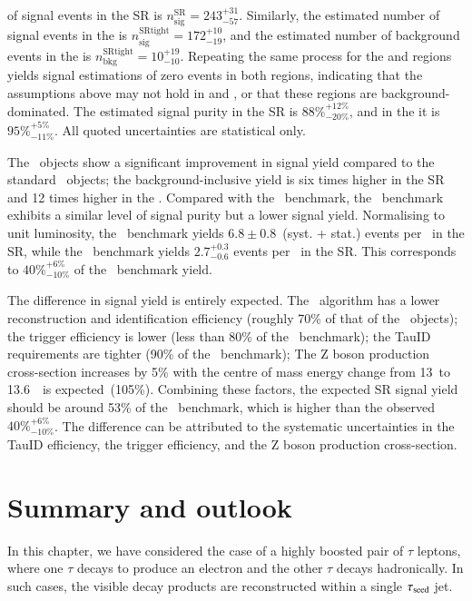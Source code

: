         of signal events in the SR is \( n^\mathrm{SR}_\mathrm{sig} = 243^{+31}_{-57} \). 
        Similarly, the estimated number of signal events in the \SRtight is 
        \( n^\mathrm{SRtight}_\mathrm{sig} = 172^{+10}_{-19} \), and the estimated number 
        of background events in the \SRtight is \( n^\mathrm{SRtight}_\mathrm{bkg} = 10^{+19}_{-10} \).
        Repeating the same process for the \SRstd and \SRtightstd regions yields signal 
        estimations of zero events in both regions, indicating that the assumptions above 
        may not hold in \SRstd and \SRtightstd, or that these regions are background-dominated.
        The estimated signal purity in the SR is \( 88\%^{+12\%}_{-20\%} \), 
        and in the \SRtight it is \( 95\%^{+5\%}_{-11\%} \). All quoted uncertainties are statistical only.
        
        The \tauhaderm\ objects show a significant improvement in signal yield compared to the standard 
        \tauhad\ objects; the background-inclusive yield is six times higher in the SR and 12 times 
        higher in the \SRtight. Compared with the \tauhadmurm\ benchmark, the \tauhaderm\ benchmark 
        exhibits a similar level of signal purity but a lower signal yield. Normalising to unit 
        luminosity, the \tauhadmurm\ benchmark yields $6.8 \pm 0.8$~(syst. + stat.) events per \ifb\ in the SR, 
        while the \tauhaderm\ benchmark yields $2.7^{+0.3}_{-0.6}$ events per \ifb\ in the SR. 
        This corresponds to $40\%^{+6\%}_{-10\%}$ of the \tauhadmurm\ benchmark yield.

        The difference in signal yield is entirely expected. The \tauhaderm\ algorithm has a lower 
        reconstruction and identification efficiency (roughly 70\% of that of the \tauhadmurm\ objects); 
        the trigger efficiency is lower (less than 80\% of the \tauhadmurm\ benchmark); 
        the TauID requirements are tighter (90\% of the \tauhadmurm\ benchmark); 
        The Z boson production cross-section increases by 5\% 
        with the centre of mass energy change from 13~\TeV to 13.6~\TeV\ 
        is expected~(105\%).
        Combining these factors, the expected SR signal yield should be around 53\%
        of the \tauhadmurm\ benchmark, 
        which is higher than the observed $40\%^{+6\%}_{-10\%}$.
        The difference can be attributed to the systematic uncertainties in the
        TauID efficiency, the trigger efficiency, and the Z boson production cross-section.

\section{Summary and outlook}
    \label{sec:erm:summary}
    In this chapter, we have considered the case of a highly boosted pair 
    of $\tau$ leptons, where one $\tau$ decays to produce an electron and 
    the other $\tau$ decays hadronically. In such cases, the visible decay 
    products are reconstructed within a single $\tau_\mathrm{seed}$ jet.

